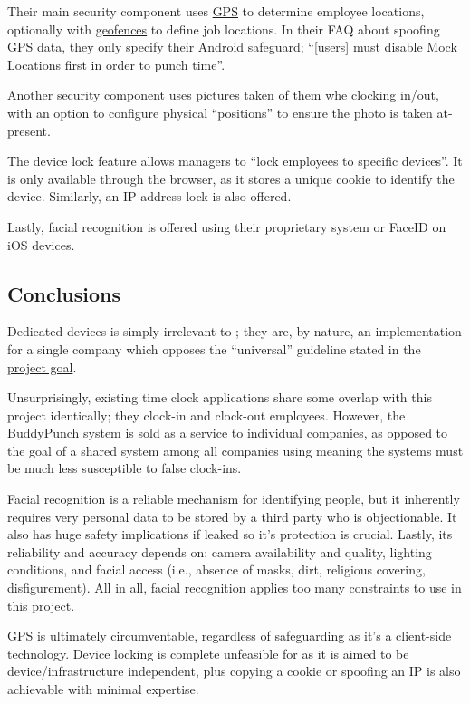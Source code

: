 Their main security component uses \hyperref[ss:gps]{GPS}
to determine employee locations, optionally with
\hyperref[ss:geofencing]{geofences} to define job
locations.
In their FAQ about spoofing GPS data, they only specify
their Android safeguard; \enquote{[users] must disable Mock
  Locations first in order to punch time}.

Another security component uses pictures taken of them whe
clocking in/out, with an option to configure physical
\enquote{positions} to ensure the photo is taken
at-present.

The device lock feature allows managers to \enquote{lock
  employees to specific devices}.
It is only available through the browser, as it stores a
unique cookie to identify the device.
Similarly, an IP address lock is also offered.

Lastly, facial recognition is offered using their
proprietary system or FaceID on iOS devices.

\subsection{Conclusions}

Dedicated devices is simply irrelevant to \projectname{};
they are, by nature, an implementation for a single company
which opposes the \enquote{universal} guideline stated in
the \hyperref[s:goal]{project goal}.

Unsurprisingly, existing time clock applications share some
overlap with this project identically; they clock-in and
clock-out employees.
However, the BuddyPunch system is sold as a service to
individual companies, as opposed to the goal of a shared
system among all companies using \projectname{} meaning the
systems must be much less susceptible to false clock-ins.

Facial recognition is a reliable mechanism for identifying
people, but it inherently requires very personal data to be
stored by a third party who is objectionable. It also has
huge safety implications if leaked so it's protection is
crucial. Lastly, its reliability and accuracy depends on:
camera availability and quality, lighting conditions, and
facial access (i.e., absence of masks, dirt, religious
covering, disfigurement). All in all, facial recognition
applies too many constraints to use in this project.

GPS is ultimately circumventable, regardless of safeguarding
as it's a client-side technology. Device locking is complete
unfeasible for \projectname{} as it is aimed to be
device/infrastructure independent, plus copying a cookie or
spoofing an IP is also achievable with minimal expertise. 

